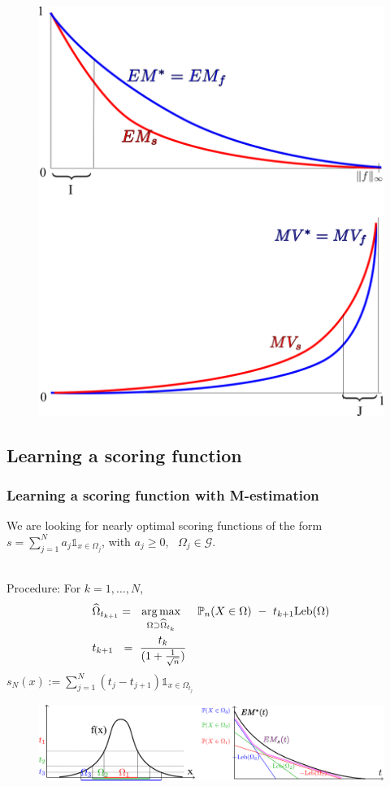 \documentclass[10pt]{beamer}
\newcommand\blue{\color{blue} }
\def\argmax{\operatornamewithlimits{arg\,max}}
\def\leb{\text{Leb}}
\begin{document}
\begin{frame}
\begin{figure}
\includegraphics[width = 0.7\linewidth]{emmv.png}
\end{figure}
\end{frame}

\subsection{Learning a scoring function}

\begin{frame}
\frametitle{Learning a scoring function with M-estimation}



We are looking for nearly optimal scoring functions of the form {\blue $s = \sum_{j=1}^N a_j \mathds{1}_{x \in \Omega_j}$}, with $a_j \ge 0$,~ $\Omega_j \in \mathcal{G}$.\\~\\


\begin{block}{}
{\blue Procedure}:  For $k=1, \ldots, N$,
%
\begin{align*}
&\widehat \Omega_{t_{k+1}} =~~ \argmax_{\Omega \supset \widehat \Omega_{t_k}} ~~~~ \mathbb{P}_n(X \in \Omega) ~-~ t_{k+1} \leb(\Omega)\\
&t_{k+1} ~~=~ \frac{t_k}{(1 + \frac{1}{\sqrt n})}
\end{align*}
%
$s_N(x) := \sum_{j=1}^N(t_j - t_{j+1}) \mathds{1}_{x \in \Omega_{t_j}}$
\begin{figure}
\includegraphics[width=\linewidth]{em_optim.png}
\end{figure}
\end{block}

\end{frame}
\end{document}
